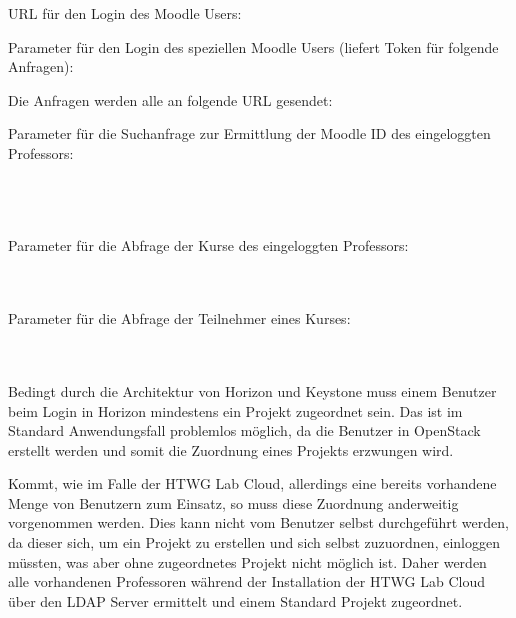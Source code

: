 URL für den Login des Moodle Users:\\

Parameter für den Login des speziellen Moodle Users (liefert Token für folgende Anfragen):\\

Die Anfragen werden alle an folgende URL gesendet:\\

Parameter für die Suchanfrage zur Ermittlung der Moodle ID des eingeloggten Professors:\\
\\
\\
\\

Parameter für die Abfrage der Kurse des eingeloggten Professors:\\
\\
\\

Parameter für die Abfrage der Teilnehmer eines Kurses:\\
\\
\\

Bedingt durch die Architektur von Horizon und Keystone muss einem Benutzer beim Login in Horizon mindestens ein Projekt zugeordnet sein. Das ist im Standard Anwendungsfall problemlos möglich, da die Benutzer in OpenStack erstellt werden und somit die Zuordnung eines Projekts erzwungen wird.

Kommt, wie im Falle der HTWG Lab Cloud, allerdings eine bereits vorhandene Menge von Benutzern zum Einsatz, so muss diese Zuordnung anderweitig vorgenommen werden. Dies kann nicht vom Benutzer selbst durchgeführt werden, da dieser sich, um ein Projekt zu erstellen und sich selbst zuzuordnen, einloggen müssten, was aber ohne zugeordnetes Projekt nicht möglich ist. Daher werden alle vorhandenen Professoren während der Installation der HTWG Lab Cloud über den LDAP Server ermittelt und einem Standard Projekt zugeordnet.

